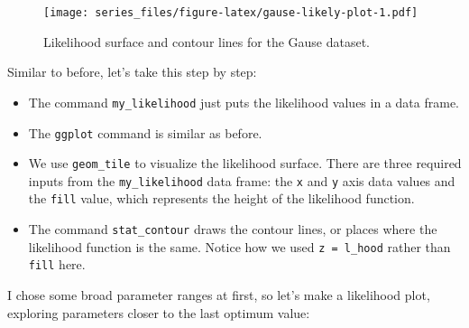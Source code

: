 \documentclass[
]{book}
\providecommand{\tightlist}{%
  \setlength{\itemsep}{0pt}\setlength{\parskip}{0pt}}
\theoremstyle{definition}
\theoremstyle{definition}
\theoremstyle{definition}
\theoremstyle{remark}
\begin{document}
\begin{figure}
\centering
\texttt{[image: series\_files/figure-latex/gause-likely-plot-1.pdf]}
\caption{\label{fig:gause-likely-plot}Likelihood surface and contour lines for the Gause dataset.}
\end{figure}

Similar to before, let's take this step by step:

\begin{itemize}
\tightlist
\item
  The command \texttt{my\_likelihood} just puts the likelihood values in a data frame.
\item
  The \texttt{ggplot} command is similar as before.
\item
  We use \texttt{geom\_tile} to visualize the likelihood surface. There are three required inputs from the \texttt{my\_likelihood} data frame: the \texttt{x} and \texttt{y} axis data values and the \texttt{fill} value, which represents the height of the likelihood function.
\item
  The command \texttt{stat\_contour} draws the contour lines, or places where the likelihood function is the same. Notice how we used \texttt{z\ =\ l\_hood} rather than \texttt{fill} here.
\end{itemize}

I chose some broad parameter ranges at first, so let's make a likelihood plot, exploring parameters closer to the last optimum value:
\end{document}
